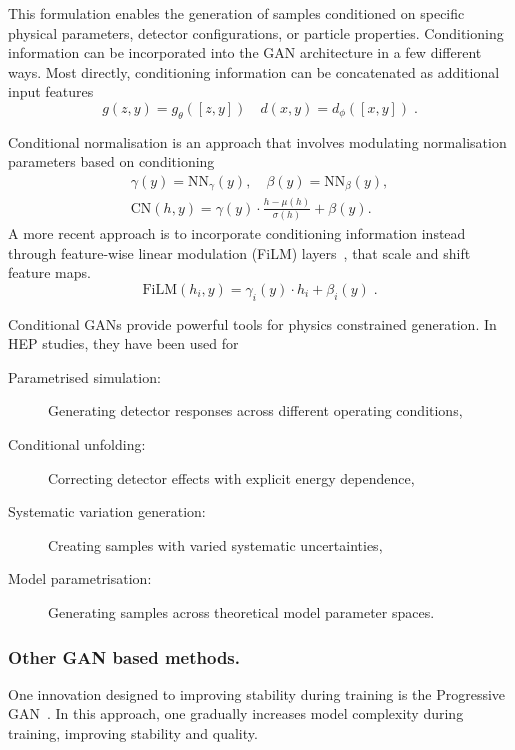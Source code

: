         This formulation enables the generation of samples conditioned on specific physical parameters, detector configurations, or particle properties.
        Conditioning information can be incorporated into the GAN architecture in a few different ways.
        Most directly, conditioning information can be concatenated as additional input features
        \begin{equation}
             g(z,y) = g_{\theta}([z, y])\quad d(x,y) = d_{\phi}([x,y])\;.
        \end{equation}
        
        Conditional normalisation is an approach that involves modulating normalisation parameters based on conditioning
        \begin{gather}
            \gamma(y) = \text{NN}_{\gamma}(y),\quad\beta(y) = \text{NN}_{\beta}(y),\\
            \text{CN}(h,y) = \gamma(y) \cdot \frac{h - \mu(h)}{\sigma(h)} + \beta(y).
        \end{gather}
        A more recent approach is to incorporate conditioning information instead through feature-wise linear modulation (FiLM) layers~\cite{DBLP:journals/corr/abs-1709-07871,Algren:2025zff,Rodriguez:2025ccs,Chatterjee:2024ddw,Li:2022kxc,turkoglu2022filmensembleprobabilisticdeeplearning}, that scale and shift feature maps.
        \begin{equation}
            \text{FiLM}(h_i,y) = \gamma_i(y) \cdot h_i + \beta_i(y)\;.
        \end{equation}

        Conditional GANs provide powerful tools for physics constrained generation.
        In HEP studies, they have been used for
        \begin{description}
            \item[Parametrised simulation:] Generating detector responses across different operating conditions,
            \item[Conditional unfolding:] Correcting detector effects with explicit energy dependence,
            \item[Systematic variation generation:] Creating samples with varied systematic uncertainties,
            \item[Model parametrisation:] Generating samples across theoretical model parameter spaces.       
        \end{description}

        \subsubsection{Other GAN based methods.}
            One innovation designed to improving stability during training is the Progressive GAN~\cite{karras_progressive_2018}.
            In this approach, one gradually increases model complexity during training, improving stability and quality.
            
